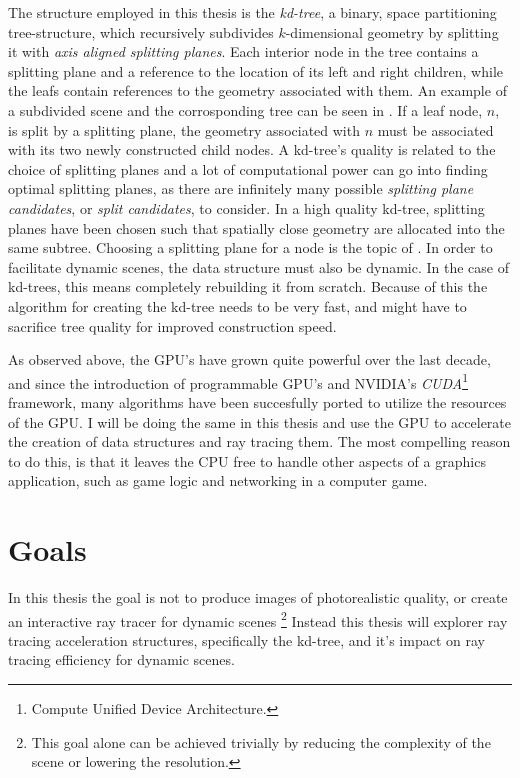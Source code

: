 The structure employed in this thesis is the \textit{kd-tree}, a
binary, space partitioning tree-structure, which recursively
subdivides $k$-dimensional geometry by splitting it with \textit{axis
  aligned splitting planes}. Each interior node in the tree contains a
splitting plane and a reference to the location of its left and right
children, while the leafs contain references to the geometry
associated with them. An example of a subdivided scene and the
corrosponding tree can be seen in . If
a leaf node, $n$, is split by a splitting plane, the geometry
associated with $n$ must be associated with its two newly constructed
child nodes. A kd-tree's quality is related to the choice of splitting
planes and a lot of computational power can go into finding optimal
splitting planes, as there are infinitely many possible
\textit{splitting plane candidates}, or \textit{split candidates}, to
consider. In a high quality kd-tree, splitting planes have been chosen
such that spatially close geometry are allocated into the same
subtree. Choosing a splitting plane for a node is the topic of
. In order to facilitate dynamic
scenes, the data structure must also be dynamic. In the case of
kd-trees, this means completely rebuilding it from scratch. Because of
this the algorithm for creating the kd-tree needs to be very fast, and
might have to sacrifice tree quality for improved construction speed.



As observed above, the GPU's have grown quite powerful over the last
decade, and since the introduction of programmable GPU's and NVIDIA's
\textit{CUDA}\footnote{Compute Unified Device Architecture.}
framework, many algorithms have been succesfully ported to utilize the
resources of the GPU. I will be doing the same in this thesis and use
the GPU to accelerate the creation of data structures and ray tracing
them. The most compelling reason to do this, is that it leaves the CPU
free to handle other aspects of a graphics application, such as game
logic and networking in a computer game.



\section{Goals}

In this thesis the goal is not to produce images of photorealistic
quality, or create an interactive ray tracer for dynamic
scenes \footnote{This goal alone can be achieved trivially by
  reducing the complexity of the scene or lowering the resolution.}
Instead this thesis will explorer ray tracing acceleration structures,
specifically the kd-tree, and it's impact on ray tracing efficiency
for dynamic scenes.

